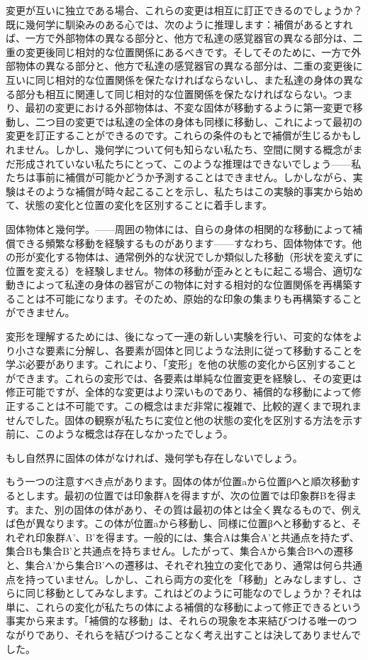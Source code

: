 \documentclass[a4paper,11pt,openany]{ltjsbook}
\begin{document}
変更が互いに独立である場合、これらの変更は相互に訂正できるのでしょうか？既に幾何学に馴染みのある心では、次のように推理します：補償があるとすれば、一方で外部物体の異なる部分と、他方で私達の感覚器官の異なる部分は、二重の変更後同じ相対的な位置関係にあるべきです。そしてそのために、一方で外部物体の異なる部分と、他方で私達の感覚器官の異なる部分は、二重の変更後に互いに同じ相対的な位置関係を保たなければならないし、また私達の身体の異なる部分も相互に関連して同じ相対的な位置関係を保たなければならない。つまり、最初の変更における外部物体は、不変な固体が移動するように第一変更で移動し、二つ目の変更では私達の全体の身体も同様に移動し、これによって最初の変更を訂正することができるのです。これらの条件のもとで補償が生じるかもしれません。しかし、幾何学について何も知らない私たち、空間に関する概念がまだ形成されていない私たちにとって、このような推理はできないでしょう——私たちは事前に補償が可能かどうか予測することはできません。しかしながら、実験はそのような補償が時々起こることを示し、私たちはこの実験的事実から始めて、状態の変化と位置の変化を区別することに着手します。

固体物体と幾何学。——周囲の物体には、自らの身体の相関的な移動によって補償できる頻繁な移動を経験するものがあります——すなわち、固体物体です。他の形が変化する物体は、通常例外的な状況でしか類似した移動（形状を変えずに位置を変える）を経験しません。物体の移動が歪みとともに起こる場合、適切な動きによって私達の身体の器官がこの物体に対する相対的な位置関係を再構築することは不可能になります。そのため、原始的な印象の集まりも再構築することができません。

変形を理解するためには、後になって一連の新しい実験を行い、可変的な体をより小さな要素に分解し、各要素が固体と同じような法則に従って移動することを学ぶ必要があります。これにより、「変形」を他の状態の変化から区別することができます。これらの変形では、各要素は単純な位置変更を経験し、その変更は修正可能ですが、全体的な変更はより深いものであり、補償的な移動によって修正することは不可能です。この概念はまだ非常に複雑で、比較的遅くまで現れませんでした。固体の観察が私たちに変位と他の状態の変化を区別する方法を示す前に、このような概念は存在しなかったでしょう。

もし自然界に固体の体がなければ、幾何学も存在しないでしょう。

もう一つの注意すべき点があります。固体の体が位置aから位置βへと順次移動するとします。最初の位置では印象群Aを得ますが、次の位置では印象群Bを得ます。また、別の固体の体があり、その質は最初の体とは全く異なるもので、例えば色が異なります。この体が位置aから移動し、同様に位置βへと移動すると、それぞれ印象群A'、B'を得ます。一般的には、集合Aは集合A'と共通点を持たず、集合Bも集合B'と共通点を持ちません。したがって、集合Aから集合Bへの遷移と、集合A'から集合B'への遷移は、それぞれ独立の変化であり、通常は何ら共通点を持っていません。しかし、これら両方の変化を「移動」とみなしますし、さらに同じ移動としてみなします。これはどのように可能なのでしょうか？それは単に、これらの変化が私たちの体による補償的な移動によって修正できるという事実から来ます。「補償的な移動」は、それらの現象を本来結びつける唯一のつながりであり、それらを結びつけることなく考え出すことは決してありませんでした。
\end{document}
